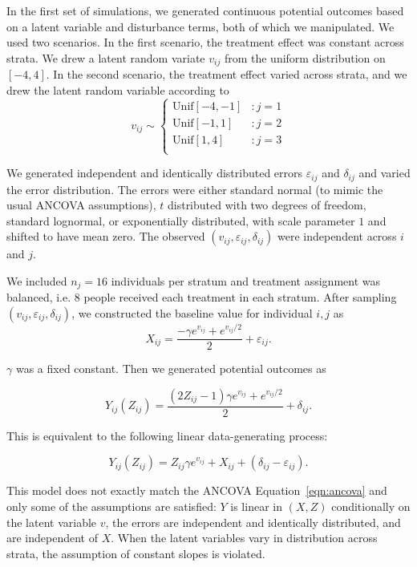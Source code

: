 \documentclass[12pt]{article}
\begin{document}
In the first set of simulations, we generated continuous potential outcomes based on a latent variable and disturbance terms, both of which we manipulated.
We used two scenarios.
In the first scenario, the treatment effect was constant across strata.
We drew a latent random variate $v_{ij}$ from the uniform distribution on $[-4, 4]$.
In the second scenario, the treatment effect varied across strata, and we drew the latent random variable according to
\begin{displaymath}
   v_{ij} \sim \left\{
     \begin{array}{lr}
       \text{Unif}[-4, -1] & : j=1\\
       \text{Unif}[-1, 1] & : j=2\\
       \text{Unif}[1, 4] & : j=3\\
     \end{array}
   \right.
\end{displaymath} 

We generated independent and identically distributed errors $\varepsilon_{ij}$ and $\delta_{ij}$ and varied the error distribution. 
The errors were either standard normal (to mimic the usual ANCOVA assumptions),
$t$ distributed with two degrees of freedom,
standard lognormal,
or exponentially distributed, with scale parameter $1$ and shifted to have mean zero.
The observed $(v_{ij}, \varepsilon_{ij}, \delta_{ij})$ were independent across $i$ and $j$.

We included $n_j=16$ individuals per stratum and treatment assignment was balanced, i.e. 8 people received each treatment in each stratum.
After sampling $(v_{ij}, \varepsilon_{ij}, \delta_{ij})$, we constructed the baseline value for individual $i,j$ as 
$$ X_{ij} = \frac{-\gamma e^{v_{ij}} + e^{v_{ij}/2}}{2} + \varepsilon_{ij}.$$

\noindent $\gamma$ was a fixed constant.
Then we generated potential outcomes as

$$Y_{ij}(Z_{ij}) = \frac{(2Z_{ij} - 1)\gamma e^{v_{ij}} + e^{v_{ij}/2}}{2} + \delta_{ij}.$$


\noindent This is equivalent to the following linear data-generating process:

$$Y_{ij}(Z_{ij}) = Z_{ij} \gamma e^{v_{ij}} + X_{ij} + (\delta_{ij} - \varepsilon_{ij}).$$

\noindent This model does not exactly match the ANCOVA Equation~\ref{eqn:ancova} and only some of the assumptions are satisfied:
$Y$ is linear in $(X, Z)$ conditionally on the latent variable $v$, 
the errors are independent and identically distributed, and are independent of $X$.
When the latent variables vary in distribution across strata, the assumption of constant slopes is violated.
\end{document}
